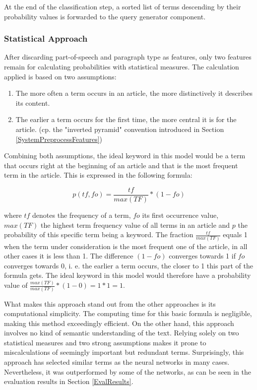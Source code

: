 \documentclass[11pt,a4paper,twoside]{article}
\begin{document}
At the end of the classification step, a sorted list of terms descending by their probability values is forwarded to the query generator component.

\subsubsection{Statistical Approach} \label{SystemClassificationStat}

After discarding part-of-speech and paragraph type as features, only two features remain for calculating probabilities with statistical measures. The calculation applied is based on two assumptions:

\begin{enumerate}
    \item The more often a term occurs in an article, the more distinctively it describes its content.
    \item The earlier a term occurs for the first time, the more central it is for the article. (cp. the "inverted pyramid" convention introduced in Section \ref{SystemPreprocessFeatures})
\end{enumerate}

\noindent Combining both assumptions, the ideal keyword in this model would be a term that occurs right at the beginning of an article and that is the most frequent term in the article. This is expressed in the following formula:

\[
p(tf, fo) = \frac{tf}{max(TF)} * (1 - fo)
\]

\noindent where $tf$ denotes the frequency of a term, $fo$ its first occurrence value, $max(TF)$ the highest term frequency value of all terms in an article and $p$ the probability of this specific term being a keyword. The fraction $\frac{tf}{max(TF)}$ equals 1 when the term under consideration is the most frequent one of the article, in all other cases it is less than 1. The difference $(1 - fo)$ converges towards 1 if $fo$ converges towards 0, i. e. the earlier a term occurs, the closer to 1 this part of the formula gets. The ideal keyword in this model would therefore have a probability value of $\frac{max(TF)}{max(TF)} * (1 - 0) = 1 * 1 = 1$.

What makes this approach stand out from the other approaches is its computational simplicity. The computing time for this basic formula is negligible, making this method exceedingly efficient. On the other hand, this approach involves no kind of semantic understanding of the text. Relying solely on two statistical measures and two strong assumptions makes it prone to miscalculations of seemingly important but redundant terms. Surprisingly, this approach has selected similar terms as the neural networks in many cases. Nevertheless, it was outperformed by some of the networks, as can be seen in the evaluation results in Section \ref{EvalResults}.
\end{document}
